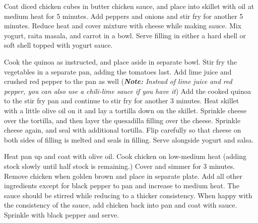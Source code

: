 \documentclass[oneside]{recipe}
\begin{document}
Coat diced chicken cubes in butter chicken sauce, and place into skillet with oil at medium heat for 5 minutes. Add peppers and onions and stir fry for another 5 minutes. Reduce heat and cover mixture with cheese while making sauce.
Mix yogurt, raita masala, and carrot in a bowl. Serve filling in either a hard shell or soft shell topped with yogurt sauce. 


Cook the quinoa as instructed, and place aside in separate bowl. Stir fry the vegetables in a separate pan, adding the tomatoes last. Add lime juice and crushed red pepper to the pan as well (\textit{\textbf{Note: } Instead of lime juice and red pepper, you can also use a chili-lime sauce if you have it}) Add the cooked quinoa to the stir fry pan and continue to stir fry for another 3 minutes. Heat skillet with a little olive oil on it and lay a tortilla down on the skillet. Sprinkle cheese over the tortilla, and then layer the quesadilla filling over the cheese. Sprinkle cheese again, and seal with additional tortilla. Flip carefully so that cheese on both sides of filling is melted and seals in filling. Serve alongside yogurt and salsa. 


Heat pan up and coat with olive oil. Cook chicken on low-medium heat (adding stock slowly until half stock is remaining.) Cover and simmer for 3 minutes. Remove chicken when golden brown and place in separate plate. Add all other ingredients except for black pepper to pan and increase to medium heat. The sauce should be stirred while reducing to a thicker consistency. When happy with the consistency of the sauce, add chicken back into pan and coat with sauce. Sprinkle with black pepper and serve. 
\end{document}

